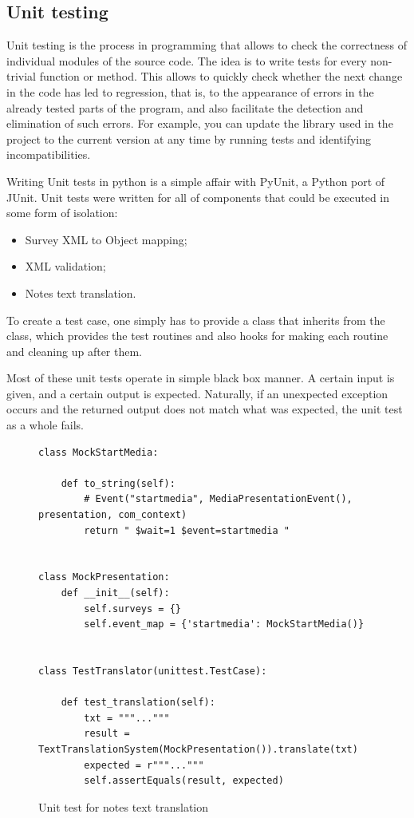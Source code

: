 \documentclass[12pt, fleqn, a4paper]{article}
\begin{document}
\subsection{Unit testing}
Unit testing is the process in programming that allows to check the correctness of individual modules of the source code.
The idea is to write tests for every non-trivial function or method. This allows to quickly check whether the next change in the code has led to regression, that is, to the appearance of errors in the already tested parts of the program, and also facilitate the detection and elimination of such errors. For example, you can update the library used in the project to the current version at any time by running tests and identifying incompatibilities.\par
Writing Unit tests in python is a simple affair with PyUnit, a Python port of JUnit. 
Unit tests were written for all of components that could be executed in some form of isolation:
\begin{itemize}
	\item Survey XML to Object mapping;
	\item XML validation;
	\item Notes text translation.
\end{itemize}
To create a test case, one simply has to provide a class that inherits from the  class, which provides the test routines and also hooks for making each routine and cleaning up after them.\par
Most of these unit tests operate in simple black box manner. A certain input is given, and a certain output is expected. Naturally, if an unexpected exception occurs and the returned output does not match what was expected, the unit test as a whole fails.
\begin{figure}[H]
	\centering
	\begin{verbatim} 
class MockStartMedia:

    def to_string(self):
        # Event("startmedia", MediaPresentationEvent(), presentation, com_context)
        return " $wait=1 $event=startmedia "


class MockPresentation:
    def __init__(self):
        self.surveys = {}
        self.event_map = {'startmedia': MockStartMedia()}


class TestTranslator(unittest.TestCase):

    def test_translation(self):
        txt = """..."""
        result = TextTranslationSystem(MockPresentation()).translate(txt)
        expected = r"""..."""
        self.assertEquals(result, expected)

	\end{verbatim}
	\caption{Unit test for notes text translation}
\end{figure}
\end{document}
